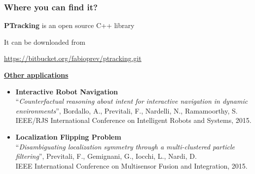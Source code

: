 \begin{frame}
	\frametitle{Where you can find it?}
	
	\Large
	
	\vspace{0.4cm}
	
	\textbf{PTracking} is an open source C++ library
	
	\vspace{0.2cm}
	
	It can be downloaded from
	
	\vspace{-0.2cm}
	
	\begin{center}
		\textcolor{blue}{\url{https://bitbucket.org/fabioprev/ptracking.git}}
	\end{center}
	
	\vspace{0.1cm}
	
	\underline{\textbf{Other applications}}
	
	\begin{itemize}
		\large
		\item \textbf{Interactive Robot Navigation} \\
			  \vspace{0.05cm}
			  \footnotesize ``\emph{Counterfactual reasoning about intent for interactive navigation in
			  dynamic environments}'', Bordallo, A., Previtali, F., Nardelli, N., Ramamoorthy, S. \\
			  \vspace{0.01cm}
			  IEEE/RJS International Conference on Intelligent Robots and Systems, 2015. \\
		\large
		\item \textbf{Localization Flipping Problem} \\
			  \vspace{0.05cm}
			  \footnotesize ``\emph{Disambiguating localization symmetry through a multi-clustered
			  particle filtering}'', Previtali, F., Gemignani, G., Iocchi, L., Nardi, D. \\
			  \vspace{0.01cm}
			  IEEE International Conference on Multisensor Fusion and Integration, 2015. \\
	\end{itemize}
\end{frame}

